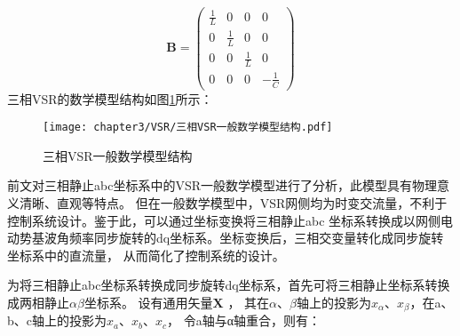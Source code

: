 \begin{equation}
	\boldsymbol{B}=
	\begin{pmatrix}
		\frac{1}{L} & 0           & 0           & 0            \\
		0           & \frac{1}{L} & 0           & 0            \\
		0           & 0           & \frac{1}{L} & 0            \\
		0           & 0           & 0           & -\frac{1}{C}
	\end{pmatrix}
\end{equation}
三相VSR的数学模型结构如图\ref{fig:三相VSR一般数学模型结构}所示：

\begin{figure}[!htp]
	\centering
	\texttt{[image: chapter3/VSR/三相VSR一般数学模型结构.pdf]}
	\caption{三相VSR一般数学模型结构}
	\label{fig:三相VSR一般数学模型结构}
\end{figure}

前文对三相静止abc坐标系中的VSR一般数学模型进行了分析，此模型具有物理意义清晰、直观等特点。
但在一般数学模型中，VSR网侧均为时变交流量，不利于控制系统设计。鉴于此，可以通过坐标变换将三相静止abc
坐标系转换成以网侧电动势基波角频率同步旋转的dq坐标系。坐标变换后，三相交变量转化成同步旋转坐标系中的直流量，
从而简化了控制系统的设计。

为将三相静止abc坐标系转换成同步旋转dq坐标系，首先可将三相静止坐标系转换成两相静止$\alpha\beta$坐标系。
设有通用矢量$\boldsymbol{X}$ ，
其在$\alpha$、$\beta$轴上的投影为$x_{\alpha}$、$x_{\beta}$，在a、b、c轴上的投影为$x_{a}$、$x_{b}$、$x_{c}$，
令a轴与α轴重合，则有：

